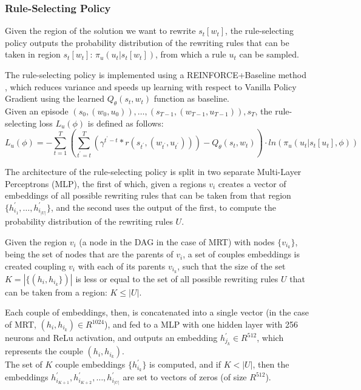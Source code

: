 \documentclass[12pt]{article}
\begin{document}
\medbreak
\subsubsection{Rule-Selecting Policy}
\label{sec:rule_policy_repairing}
Given the region of the solution we want to rewrite $s_t[w_t]$, the rule-selecting policy outputs the probability distribution of the rewriting rules that can be taken in region $s_t[w_t]$: $\pi_{u}(u_t|s_t[w_t])$, from which a rule $u_t$ can be sampled.

\medbreak
The rule-selecting policy is implemented using a REINFORCE+Baseline method \cite{rl_introduction}, which reduces variance and speeds up learning with respect to Vanilla Policy Gradient using the learned $Q_{\theta}(s_t,w_t)$ function as baseline.\\
Given an episode $\left(s_0,(w_0,u_0)\right),\dots, \left(s_{T-1},(w_{T-1},u_{T-1})\right), s_T$, the rule-selecting loss $L_u(\phi)$ is defined as follows:
$$ L_u(\phi) = -\sum_{t=1}^{T}\left(\sum_{t^{'}=t}^{T}\left(\gamma^{t^{'}-t}*r(s_{t^{'}},(w_{t^{'}},u_{t^{'}}))\right) - Q_{\theta}(s_t,w_t)\right) \cdot ln(\pi_u(u_t|s_t[u_t],\phi))$$

The architecture of the rule-selecting policy is split in two separate Multi-Layer Perceptrons (MLP), the first of which, given a regions $v_i$ creates a vector of embeddings of all possible rewriting rules that can be taken from that region $\{h^{'}_{i_1},\dots,h^{'}_{i_{|U|}}\}$, and the second uses the output of the first, to compute the probability distribution of the rewriting rules $U$.

\medbreak
Given the region $v_i$ (a node in the DAG in the case of MRT) with nodes $\{v_{i_k}\}$, being the set of nodes that are the parents of $v_i$, a set of couples embeddings is created coupling $v_i$ with each of its parents $v_{i_k}$, such that the size of the set $K = |\{(h_i,h_{i_k}\})|$ is less or equal to the set of all possible rewriting rules $U$ that can be taken from a region: $K \le |U|$.

Each couple of embeddings, then, is concatenated into a single vector (in the case of MRT, $(h_i,h_{i_k}) \in R^{1024}$), and fed to a MLP with one hidden layer with 256 neurons and ReLu activation, and outputs an embedding $h^{'}_{j_k} \in R^{512}$, which represents the couple $(h_i,h_{i_k})$.\\
The set of $K$ couple embeddings $\{h^{'}_{i_k}\}$ is computed, and if $K < |U|$, then the embeddings $h^{'}_{i_{K+1}},h^{'}_{i_{K+2}},\dots,h^{'}_{i_{|U|}}$ are set to vectors of zeros (of size $R^{512}$).\\
\end{document}
